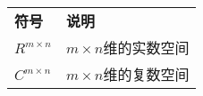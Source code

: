 \documentclass{standalone}
\begin{document}

\begin{thesissymbols}

{
\renewcommand{\arraystretch}{1}

\begin{table}[htb!]
	\begin{tabular}{>{\xiaosihao}p{2 cm}>{\xiaosihao}p{8cm}}	%
		\textbf{符号} & \textbf{说明} \\
		$R^{m \times n}$ & $m \times n$维的实数空间 \\
		$C^{m \times n}$ & $m \times n$维的复数空间	\\	
	\end{tabular}
\end{table}
}

\end{thesissymbols}

\clearpage
 \phantom{s}
 \thispagestyle{empty}
\end{document}
